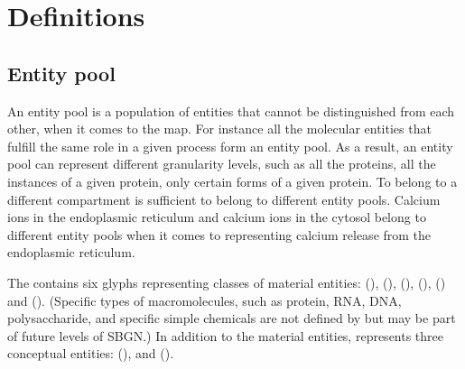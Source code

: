 
\section{Definitions}


\subsection{Entity pool}\label{sec:EPNs}

An entity pool is a population of entities that cannot be distinguished from each other, when it comes to the \SBGNPDLone map. For instance all the molecular  entities that fulfill the same role in a given process form an entity pool. As a result, an entity pool can represent different granularity levels, such as all the proteins, all the instances of a given protein, only certain forms of a given protein. To belong to a different compartment is sufficient to belong to different entity pools. Calcium ions in the endoplasmic reticulum and calcium ions in the cytosol belong to different entity pools when it comes to representing calcium release from the endoplasmic reticulum.

The \PD contains six glyphs representing classes of material entities:
 (),  (), 
(),  (),
 () and 
().  (Specific types of macromolecules, such as protein,
RNA, DNA, polysaccharide, and specific simple chemicals are not
defined by \PD but may be part of future levels of SBGN.)  In addition
to the material entities, \PD represents three conceptual entities:
 (), and 
().
 
